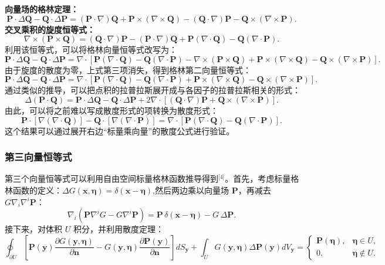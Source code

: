 \textbf{向量场的格林定理：}
$$
\mathbf{P} \cdot \Delta \mathbf{Q} - \mathbf{Q} \cdot \Delta \mathbf{P} =
(\mathbf{P} \cdot \nabla)\mathbf{Q} + \mathbf{P} \times (\nabla \times \mathbf{Q})
- (\mathbf{Q} \cdot \nabla)\mathbf{P} - \mathbf{Q} \times (\nabla \times \mathbf{P}).~
$$
\textbf{交叉乘积的旋度恒等式：}
$$
\nabla \times (\mathbf{P} \times \mathbf{Q}) =
(\mathbf{Q} \cdot \nabla)\mathbf{P} - (\mathbf{P} \cdot \nabla)\mathbf{Q}
+ \mathbf{P}(\nabla \cdot \mathbf{Q}) - \mathbf{Q}(\nabla \cdot \mathbf{P}).~
$$
利用该恒等式，可以将格林向量恒等式改写为：
$$
\mathbf{P} \cdot \Delta \mathbf{Q} - \mathbf{Q} \cdot \Delta \mathbf{P} =
\nabla \cdot
\left[
\mathbf{P}(\nabla \cdot \mathbf{Q}) - \mathbf{Q}(\nabla \cdot \mathbf{P})
- \nabla \times (\mathbf{P} \times \mathbf{Q})
+ \mathbf{P} \times (\nabla \times \mathbf{Q})
- \mathbf{Q} \times (\nabla \times \mathbf{P})
\right].~
$$
由于旋度的散度为零，上式第三项消失，得到格林第二向量恒等式：
$$
\mathbf{P} \cdot \Delta \mathbf{Q} - \mathbf{Q} \cdot \Delta \mathbf{P} =
\nabla \cdot
\left[
\mathbf{P}(\nabla \cdot \mathbf{Q}) - \mathbf{Q}(\nabla \cdot \mathbf{P})
+ \mathbf{P} \times (\nabla \times \mathbf{Q})
- \mathbf{Q} \times (\nabla \times \mathbf{P})
\right].~
$$
通过类似的推导，可以把点积的拉普拉斯展开成与各因子的拉普拉斯相关的形式：
$$
\Delta (\mathbf{P} \cdot \mathbf{Q}) =
\mathbf{P} \cdot \Delta \mathbf{Q} - \mathbf{Q} \cdot \Delta \mathbf{P}
+ 2 \nabla \cdot
\left[
(\mathbf{Q} \cdot \nabla)\mathbf{P}
+ \mathbf{Q} \times (\nabla \times \mathbf{P})
\right].~
$$
由此，可以将之前难以写成散度形式的项转换为散度形式：
$$
\mathbf{P} \cdot [\nabla(\nabla \cdot \mathbf{Q})] -
\mathbf{Q} \cdot [\nabla(\nabla \cdot \mathbf{P})]
=
\nabla \cdot
\left[
\mathbf{P}(\nabla \cdot \mathbf{Q}) -
\mathbf{Q}(\nabla \cdot \mathbf{P})
\right].~
$$
这个结果可以通过展开右边“标量乘向量”的散度公式进行验证。
\subsubsection{第三向量恒等式}
第三个向量恒等式可以利用自由空间标量格林函数推导得到\(^\text{[4]}\)。首先，考虑标量格林函数的定义：$\Delta G(\mathbf{x}, \boldsymbol{\eta}) = \delta(\mathbf{x} - \boldsymbol{\eta})$,然后两边乘以向量场 $\mathbf{P}$，再减去 $G \nabla_i \nabla^i \mathbf{P}$：
$$
\nabla_i\left(\mathbf{P} \nabla^i G - G \nabla^i \mathbf{P}\right)
= \mathbf{P} \,\delta(\mathbf{x} - \boldsymbol{\eta}) - G \,\Delta \mathbf{P}.~
$$
接下来，对体积 $U$ 积分，并利用散度定理：
$$
\oint_{\partial U} 
\left[
\mathbf{P}(\mathbf{y}) \frac{\partial G(\mathbf{y}, \boldsymbol{\eta})}{\partial \mathbf{n}}
- G(\mathbf{y}, \boldsymbol{\eta}) \frac{\partial \mathbf{P}(\mathbf{y})}{\partial \mathbf{n}}
\right] dS_{\mathbf{y}}
+ \int_U G(\mathbf{y}, \boldsymbol{\eta}) \Delta \mathbf{P}(\mathbf{y}) dV_{\mathbf{y}}
=
\begin{cases}
\mathbf{P}(\boldsymbol{\eta}), & \boldsymbol{\eta} \in U,\\
0, & \boldsymbol{\eta} \notin U.
\end{cases}~
$$
